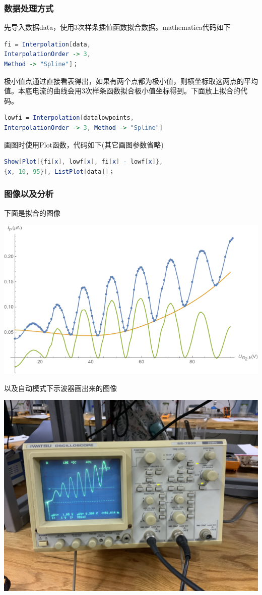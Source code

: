 \documentclass[UEF8]{ctexart}
\begin{document}
\begin{multicols}{2}
\subsubsection{数据处理方式}
先导入数据data，使用3次样条插值函数拟合数据。mathematica代码如下
\begin{lstlisting}[language=Mathematica]
fi = Interpolation[data, 
InterpolationOrder -> 3, 
Method -> "Spline"]；
\end{lstlisting}

极小值点通过直接看表得出，如果有两个点都为极小值，则横坐标取这两点的平均值。本底电流的曲线会用3次样条函数拟合极小值坐标得到。下面放上拟合的代码。
\begin{lstlisting}[language=Mathematica]
lowfi = Interpolation[datalowpoints, 
InterpolationOrder -> 3, Method -> "Spline"]
\end{lstlisting}

画图时使用Plot函数，代码如下(其它画图参数省略)
\begin{lstlisting}[language=Mathematica]
Show[Plot[{fi[x], lowf[x], fi[x] - lowf[x]}, 
{x, 10, 95}], ListPlot[data]]；
\end{lstlisting}
\subsubsection{图像以及分析}
下面是拟合的图像

\includegraphics[scale=0.40]{data2.png}

以及自动模式下示波器画出来的图像

\includegraphics[scale=0.050]{p3.jpeg}


\end{multicols}
\end{document}

